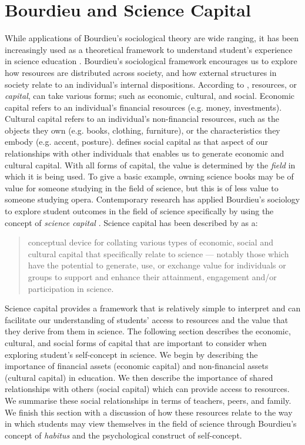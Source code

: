 \section*{Bourdieu and Science Capital}
\label{sciencecapital}
While applications of Bourdieu's sociological theory are wide ranging, it has been increasingly used as a theoretical framework to understand student's experience in science education \citep{Archer2015a}. Bourdieu's sociological framework encourages us to explore how resources are distributed across society, and how external structures in society relate to an individual's internal dispositions.  According to \citet{Bourdieu_1986}, resources, or \textit{capital}, can take various forms; such as economic, cultural, and social. Economic capital refers to an individual's financial resources (e.g. money, investments). Cultural capital refers to an individual's non-financial resources, such as the objects they own (e.g. books, clothing, furniture), or the characteristics they embody (e.g. accent, posture). \citet{Bourdieu_1986} defines social capital as that aspect of our relationships with other individuals that enables us to generate economic and cultural capital. With all forms of capital, the value is determined by the \textit{field} in which it is being used. To give a basic example, owning science books may be of value for someone studying in the field of science, but this is of less value to someone studying opera. Contemporary research has applied Bourdieu's sociology to explore student outcomes in the field of science specifically by using the concept of \textit{science capital} \citep{Archer2015a}. Science capital has been described by \cite{Archer2014} as a:
\begin{quote}
conceptual device for collating various types of economic, social and cultural capital that specifically relate to science --- notably those which have the potential to generate, use, or exchange value for individuals or groups to support and enhance their attainment, engagement and/or participation in science.
\end{quote}
Science capital provides a framework that is relatively simple to interpret and can facilitate our understanding of students' access to resources and the value that they derive from them in science. The following section describes the economic, cultural, and social forms of capital that are important to consider when exploring student's self-concept in science.  We begin by describing the importance of financial assets (economic capital) and non-financial assets (cultural capital) in education. We then describe the importance of shared relationships with others (social capital) which can provide access to resources. We summarise these social relationships in terms of teachers, peers, and family. We finish this section with a discussion of how these resources relate to the way in which students may view themselves in the field of science through Bourdieu's concept of \textit{habitus} and the psychological construct of self-concept. 

